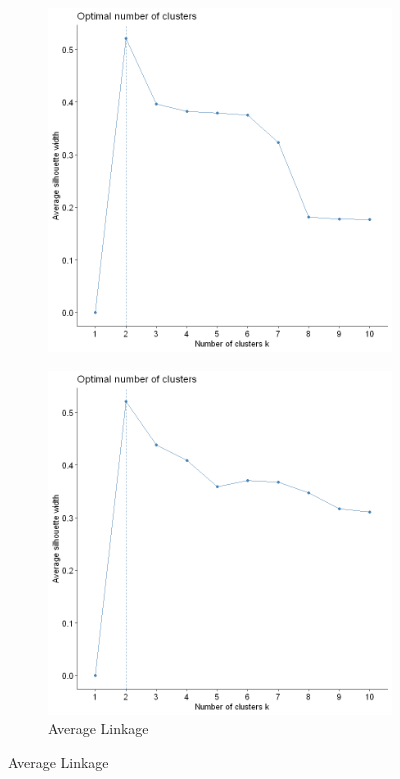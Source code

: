 \documentclass[12pt]{article}
\begin{document}
\begin{figure}[h]
\begin{subfigure}{0.45\textwidth}
		\includegraphics[width=\textwidth]{Images/Hierarchial_silhouette_complete}
	\end{subfigure}
	\begin{subfigure}{0.45\textwidth}
		\caption{Average Linkage}		
		\includegraphics[width=\textwidth]{Images/Hierarchial_silhouette_average}
	\end{subfigure}
\end{figure}
\end{document}
